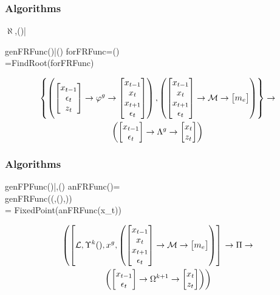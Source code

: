 \documentclass[letter]{beamer}
\begin{document}
\begin{frame}
  \frametitle{Algorithms}
  

\begin{pseudocode}{$\aleph$}{\xtGuess,()|\linMod}
\RETURN{\xzFunc\tArgZ}  
\end{pseudocode}

\label{genFRFuncDef}



\begin{pseudocode}{genFRFunc}{\xzFunc()|\modEqns()}
forFRFunc\tArgZ=\modEqns(\xzFunc\tArgZ)\\
\frFunc\tArg=FindRoot(forFRFunc\tArgZ)\\
\RETURN{\frFunc\tArg}  
\end{pseudocode}
\begin{gather}
\left \{
\left (  \begin{bmatrix} x_{t-1}\\ \epsilon_t\\z_t \end{bmatrix} \rightarrow {\varphi^g} \rightarrow \begin{bmatrix} x_{t-1}\\ x_t\\x_{t+1}\\ \epsilon_t \end{bmatrix} \right )
,
\left (  \begin{bmatrix} x_{t-1}\\x_{t}\\x_{t+1}\\ \epsilon_t \end{bmatrix} \rightarrow \mathcal{M} \rightarrow  \begin{bmatrix} m_e \end{bmatrix} \right )
 \right \}
 \rightarrow\\
\left (  \begin{bmatrix} x_{t-1}\\ \epsilon_t \end{bmatrix}  \rightarrow  {\Lambda^g} \rightarrow  \begin{bmatrix} x_t\\z_t \end{bmatrix}  \right )
\end{gather}


\end{frame}


 \begin{frame}
   \frametitle{Algorithms}
   
\label{genFPFuncDef}

 \begin{pseudocode}{genFPFunc}{()|\linMod,\modEqns()}
 anFRFunc(\xtGuess)=\\genFRFunc(\aleph(\linMod,(),\xtGuess))\\
\tArg=
 FixedPoint(anFRFunc(x_t))\\
\end{pseudocode}
{\small
\begin{gather}
  \label{eq:2}
\fMap{\Pi}
{\left [\linMod, \XZExp{k}(),x^g,
\modEqnsMap
\right ] \right .}{\\ \left .
\fpFuncMap
}
\end{gather}
}

\end{frame}
\end{document}
